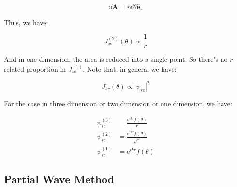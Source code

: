 \documentclass[../main.tex]{subfiles}
\begin{document}
\begin{equation}
    \dd{\bm{A}} = r \dd{\theta}\hat{\bm{e}}_r
\end{equation}

Thus, we have:

\begin{equation}
    J_{sc}^{(2)}(\theta) \propto \frac{1}{r}
\end{equation}

And in one dimension, the area is reduced into a single point. So there's no $r$ related proportion in $J^{(1)}_{sc}$. Note that, in general we have:

\begin{equation}
    J_{sc}(\theta) \propto |\psi_{sc}|^2
\end{equation}

For the case in three dimension or two dimension or one dimension, we have:

\begin{align}
    \psi^{(3)}_{sc} &= \frac{\textrm{e}^{ikr}f(\theta)}{r}\\
    \psi^{(2)}_{sc} &= \frac{\textrm{e}^{ikr}f(\theta)}{\sqrt{r}}\\
    \psi^{(1)}_{sc} &= \textrm{e}^{ikr}f(\theta)
\end{align}

\subsection{Partial Wave Method}
\end{document}

